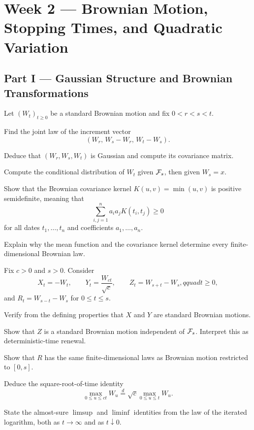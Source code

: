 
\section{Week 2 --- Brownian Motion, Stopping Times, and Quadratic Variation}

\subsection*{Part I --- Gaussian Structure and Brownian Transformations}

\begin{exercise}
Let \((W_t)_{t\geq0}\) be a standard Brownian motion and fix
\(0<r<s<t\).
\begin{exparts}
  \item Find the joint law of the increment vector
  \[
  (W_r,\,W_s-W_r,\,W_t-W_s).
  \]
  \item Deduce that \((W_r,W_s,W_t)\) is Gaussian and compute its covariance
  matrix.
  \item Compute the conditional distribution of \(W_t\) given \(\mathcal{F}_s\),
  then given \(W_s=x\).
  \item Show that the Brownian covariance kernel
  \(K(u,v)=\min(u,v)\) is positive semidefinite, meaning that
  \[
  \sum_{i,j=1}^n a_i a_j K(t_i,t_j)\geq0
  \]
  for all dates \(t_1,\ldots,t_n\) and coefficients
  \(a_1,\ldots,a_n\).
  \item Explain why the mean function and the covariance kernel determine
  every finite-dimensional Brownian law.
\end{exparts}
\end{exercise}

\begin{exercise}
Fix \(c>0\) and \(s>0\). Consider
\[
X_t=-W_t,
\qquad
Y_t=\frac{W_{ct}}{\sqrt c},
\qquad
Z_t=W_{s+t}-W_s,qquad t\geq0,
\]
and \(R_t=W_{s-t}-W_s\) for \(0\leq t\leq s\).
\begin{exparts}
  \item Verify from the defining properties that \(X\) and \(Y\) are
  standard Brownian motions.
  \item Show that \(Z\) is a standard Brownian motion independent of
  \(\mathcal{F}_s\). Interpret this as deterministic-time renewal.
  \item Show that \(R\) has the same finite-dimensional laws as Brownian
  motion restricted to \([0,s]\).
  \item Deduce the square-root-of-time identity
  \[
  \max_{0\leq u\leq ct}W_u
  \overset{d}=\sqrt c\max_{0\leq u\leq t}W_u.
  \]
  \item State the almost-sure \(\limsup\) and \(\liminf\) identities from
  the law of the iterated logarithm, both as \(t\to\infty\) and as
  \(t\downarrow0\).
\end{exparts}
\end{exercise}

